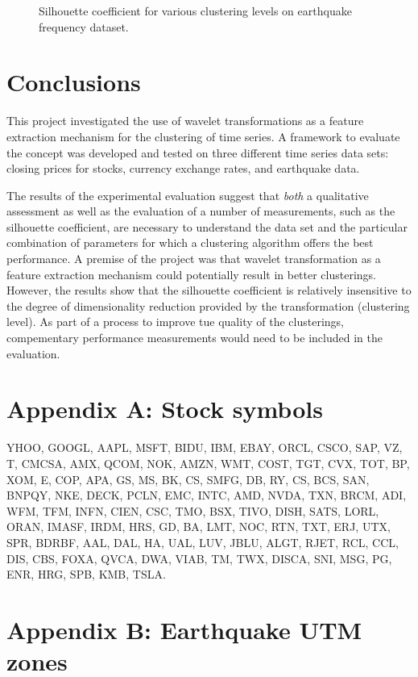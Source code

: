 \documentclass{article}
\begin{document}
\begin{figure}
\begin{center}
\caption{Silhouette coefficient for various clustering levels on earthquake frequency dataset.} \label{silhouette_score_eq}
\end{center}
\end{figure}

\section{Conclusions}

This project investigated the use of wavelet transformations as a feature extraction mechanism for the clustering of time series. A framework to evaluate the concept was developed and tested on three different time series data sets: closing prices for stocks, currency exchange rates, and earthquake data.

The results of the experimental evaluation suggest that {\em both} a qualitative assessment as well as the evaluation of a number of measurements, such as the silhouette coefficient, are necessary to understand the data set and the particular combination of parameters for which a clustering algorithm offers the best performance. A premise of the project was that wavelet transformation as a feature extraction mechanism could potentially result in better clusterings. However, the results show that the silhouette coefficient is relatively insensitive to the degree of dimensionality reduction provided by the transformation (clustering level). As part of a process to improve tue quality of the clusterings, compementary performance measurements would need to be included in the evaluation.


\appendix
\section*{Appendix A: Stock symbols}
\label{AppA}

YHOO, GOOGL, AAPL, MSFT, BIDU, IBM, EBAY, ORCL, CSCO, SAP, VZ, T, CMCSA, AMX, QCOM, NOK, AMZN, WMT, COST, TGT, CVX, TOT, BP, XOM, E, COP, APA, GS, MS, BK, CS, SMFG, DB, RY, CS, BCS, SAN, BNPQY, NKE, DECK, PCLN, EMC, INTC, AMD, NVDA, TXN, BRCM, ADI, WFM, TFM, INFN, CIEN, CSC, TMO, BSX, TIVO, DISH, SATS, LORL, ORAN, IMASF, IRDM, HRS, GD, BA, LMT, NOC, RTN, TXT, ERJ, UTX, SPR, BDRBF, AAL, DAL, HA, UAL, LUV, JBLU, ALGT, RJET, RCL, CCL, DIS, CBS, FOXA, QVCA, DWA, VIAB, TM, TWX, DISCA, SNI, MSG, PG, ENR, HRG, SPB, KMB, TSLA.

\section*{Appendix B: Earthquake UTM zones}
\label{AppB}
\end{document}
